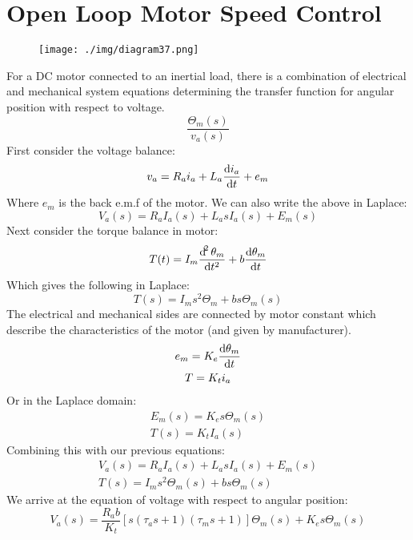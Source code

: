 \section{Open Loop Motor Speed Control}
\begin{figure}[H]
  \centering
  \texttt{[image: ./img/diagram37.png]}
\end{figure}
For a DC motor connected to an inertial load, there is a combination of electrical and mechanical system equations determining the transfer function for angular position with respect to voltage.
\begin{equation}
  \frac{\Theta_m (s)}{v_a(s)}
\end{equation}
First consider the voltage balance:
\begin{equation}
  v_a = R_a i_a + L_a \frac{\dif i_a}{\dif t} + e_m
\end{equation}
Where $e_m$ is the back e.m.f of the motor. We can also write the above in Laplace:
\begin{equation}
  V_a(s) = R_a I_a (s) + L_a s I_a (s) + E_m (s)
\end{equation}
Next consider the torque balance in motor:
\begin{equation}
  T(t) = I_m \frac{\dif^2 \theta_m}{\dif t^2} + b \frac{\dif \theta_m}{\dif t}
\end{equation}
Which gives the following in Laplace:
\begin{equation}
  T(s) = I_m s^2 \Theta_m + bs\Theta_m (s)
\end{equation}
The electrical and mechanical sides are connected by motor constant which describe the characteristics of the motor (and given by manufacturer).
\begin{gather}
  e_m = K_e \frac{\dif \theta_m}{\dif t} \\
  T = K_t i_a
\end{gather}
Or in the Laplace domain:
\begin{gather}
  E_m (s) = K_e s \Theta_m (s)\\
  T(s) = K_t I_a (s)
\end{gather}
Combining this with our previous equations:
\begin{gather}
  V_a (s) = R_a I_a (s)+L_a s I_a (s) + E_m (s)\\
  T(s) = I_m s^2 \Theta_m (s) + bs\Theta_m (s)
\end{gather}
We arrive at the equation of voltage with respect to angular position:
\begin{equation}
  V_a (s) = \frac{R_a b}{K_t} \left[ s(\tau_a s +1)(\tau_m s +1)\right] \Theta_m (s) + K_e s\Theta_m (s)
\end{equation}
